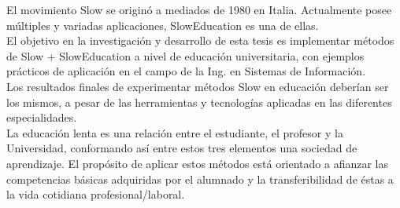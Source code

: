 % 
% 
%
El movimiento Slow se origin\'o a mediados de 1980 en Italia. Actualmente posee m\'ultiples y variadas aplicaciones, SlowEducation es una de ellas.\\
El objetivo en la investigaci\'on y desarrollo de esta tesis es implementar m\'etodos de Slow + SlowEducation a nivel de educaci\'on universitaria, 
con ejemplos pr\'acticos de aplicaci\'on en el campo de la Ing. en Sistemas de Informaci\'on.\\
Los resultados finales de experimentar m\'etodos Slow en educaci\'on deber\'ian ser los mismos, a pesar de las herramientas y tecnolog\'ias aplicadas en las
diferentes especialidades.\\
La educaci\'on lenta es una relaci\'on entre el estudiante, el profesor y la Universidad, conformando as\'i entre estos tres elementos una sociedad de 
aprendizaje. El prop\'osito de aplicar estos m\'etodos est\'a orientado a afianzar las competencias b\'asicas adquiridas por el alumnado y la transferibilidad 
de \'estas a la vida cotidiana profesional/laboral.


